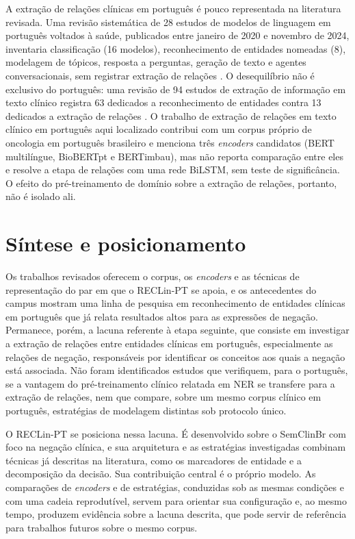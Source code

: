 A extração de relações clínicas em português é pouco representada na literatura
revisada. Uma revisão sistemática de 28 estudos de modelos de linguagem em português
voltados à saúde, publicados entre janeiro de 2020 e novembro de 2024, inventaria
classificação (16 modelos), reconhecimento de entidades nomeadas (8), modelagem de
tópicos, resposta a perguntas, geração de texto e agentes conversacionais, sem
registrar extração de relações \cite{shimaoka_2026_revisao}. O desequilíbrio não é
exclusivo do português: uma revisão de 94 estudos de extração de informação em texto
clínico registra 63 dedicados a reconhecimento de entidades contra 13 dedicados a
extração de relações \cite{navarro_2023_revisao}. O trabalho de extração de relações
em texto clínico em português aqui localizado \cite{silva_2023_oncologia} contribui
com um corpus próprio de oncologia em português brasileiro e menciona três
\emph{encoders} candidatos (BERT multilíngue, BioBERTpt e BERTimbau), mas não
reporta comparação entre eles e resolve a etapa de relações com uma rede BiLSTM, sem
teste de significância. O efeito do pré-treinamento de domínio sobre a extração de
relações, portanto, não é isolado ali.

\section{Síntese e posicionamento}

Os trabalhos revisados oferecem o corpus, os \emph{encoders} e as técnicas de
representação do par em que o RECLin-PT se apoia, e os antecedentes do campus
mostram uma linha de pesquisa em reconhecimento de entidades clínicas em português
que já relata resultados altos para as expressões de negação. Permanece, porém, a lacuna referente à etapa seguinte, que consiste em investigar a extração de relações entre entidades clínicas em português, especialmente as relações de negação, responsáveis por identificar os conceitos aos quais a negação está associada. Não foram identificados estudos que verifiquem, para o português, se a vantagem do
pré-treinamento clínico relatada em NER se transfere para a extração de relações, nem
que compare, sobre um mesmo corpus clínico em português, estratégias de modelagem
distintas sob protocolo único.

O RECLin-PT se posiciona nessa lacuna. É desenvolvido sobre o SemClinBr com foco na
negação clínica, e sua arquitetura e as estratégias investigadas combinam técnicas já
descritas na literatura, como os marcadores de entidade e a decomposição da decisão.
Sua contribuição central é o próprio modelo. As comparações de \emph{encoders} e de
estratégias, conduzidas sob as mesmas condições e com uma cadeia reprodutível, servem
para orientar sua configuração e, ao mesmo tempo, produzem evidência sobre a lacuna
descrita, que pode servir de referência para trabalhos futuros sobre o mesmo corpus.
